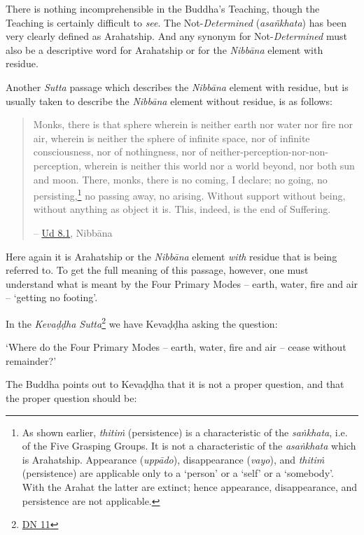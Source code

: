 There is nothing incomprehensible in the Buddha's Teaching, though the Teaching is certainly difficult to \emph{see}. The Not-\textit{Determined} (\textit{asañkhata}) has been very clearly defined as Arahatship. And any synonym for Not-\textit{Determined} must also be a descriptive word for Arahatship or for the \textit{Nibbāna} element with residue.

Another \textit{Sutta} passage which describes the \textit{Nibbāna} element with residue, but is usually taken to describe the \textit{Nibbāna} element without residue, is as follows:

\begin{quote}
Monks, there is that sphere wherein is neither earth nor water nor fire nor air, wherein is neither the sphere of infinite space, nor of infinite consciousness, nor of nothingness, nor of neither-perception-nor-non-perception, wherein is neither this world nor a world beyond, nor both sun and moon. There, monks, there is no coming, I declare; no going, no persisting,\footnote{As shown earlier, \textit{thitiṁ} (persistence) is a characteristic of the \textit{saṅkhata}, i.e. of the Five Grasping Groups. It is not a characteristic of the \textit{asaṅkhata} which is Arahatship. Appearance (\textit{uppādo}), disappearance (\textit{vayo}), and \textit{thitiṁ} (persistence) are applicable only to a `person' or a `self' or a `somebody'. With the Arahat the latter are extinct; hence appearance, disappearance, and persistence are not applicable.} no passing away, no arising. Without support without being, without anything as object it is. This, indeed, is the end of Suffering.

 -- \href{https://suttacentral.net/ud8.1/en/anandajoti}{Ud 8.1}, Nibbāna
\end{quote}

Here again it is Arahatship or the \textit{Nibbāna} element \emph{with} residue that is being referred to. To get the full meaning of this passage, however, one must understand what is meant by the Four Primary Modes -- earth, water, fire and air -- `getting no footing'.

In the \textit{Kevaḍḍha Sutta}\footnote{\href{https://suttacentral.net/dn11/en/sujato}{DN 11}} we have Kevaḍḍha asking the question:

`Where do the Four Primary Modes -- earth, water, fire and air -- cease without remainder?'

The Buddha points out to Kevaḍḍha that it is not a proper question, and that the proper question should be:

